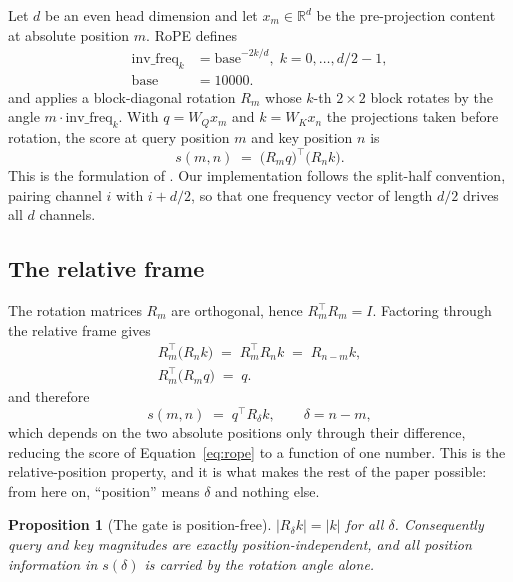 \documentclass{article}
\theoremstyle{plain}
\newtheorem{proposition}[theorem]{Proposition}
\theoremstyle{remark}
\newcommand{\R}{R}
\newcommand{\invf}{\mathrm{inv\_freq}}
\newcommand{\half}{d/2}
\begin{document}
Let $d$ be an even head dimension and let $x_m \in \mathbb{R}^d$ be the
pre-projection content at absolute position $m$. RoPE defines
\begin{equation}
  \begin{split}
    \invf_k &= \mathrm{base}^{-2k/d},\; k = 0, \dots, \half - 1,\\
    \mathrm{base} &= 10000 .
  \end{split}
\end{equation}
and applies a block-diagonal rotation $\R_m$ whose $k$-th $2\times2$ block
rotates by the angle $m \cdot \invf_k$. With $q = W_Q x_m$ and $k = W_K x_n$ the
projections taken before rotation, the score at query position $m$ and key
position $n$ is
\begin{equation}
  s(m,n) \;=\; \bigl(\R_m q\bigr)^{\!\top} \bigl(\R_n k\bigr).
  \label{eq:rope}
\end{equation}
This is the formulation of \citet{su2021ropeformer}. Our implementation follows
the split-half convention, pairing channel $i$ with $i + \half$, so that one
frequency vector of length $\half$ drives all $d$ channels.

\subsection{The relative frame}

The rotation matrices $\R_m$ are orthogonal, hence $\R_m^{\!\top}\R_m = I$.
Factoring through the relative frame gives
\begin{equation}
  \begin{split}
    \R_m^{\!\top} \bigl(\R_n k\bigr) \;=\; \R_m^{\!\top}\R_n k \;=\; \R_{n-m} k,\\
    \R_m^{\!\top} \bigl(\R_m q\bigr) \;=\; q .
  \end{split}
\end{equation}
and therefore
\begin{equation}
  s(m,n) \;=\; q^{\!\top} \R_{\delta} k, \qquad \delta = n - m,
\end{equation}
which depends on the two absolute positions only through their difference,
reducing the score of Equation~\ref{eq:rope} to a function of one number. This is
the relative-position property, and it is what makes the rest of the paper
possible: from here on, ``position'' means $\delta$ and nothing else.

\begin{proposition}[The gate is position-free]
\label{prop:gate}
$\bigl|\R_{\delta} k\bigr| = \bigl|k\bigr|$ for all $\delta$. Consequently
query and key magnitudes are exactly position-independent, and all
position information in $s(\delta)$ is carried by the rotation angle alone.
\end{proposition}
\end{document}
